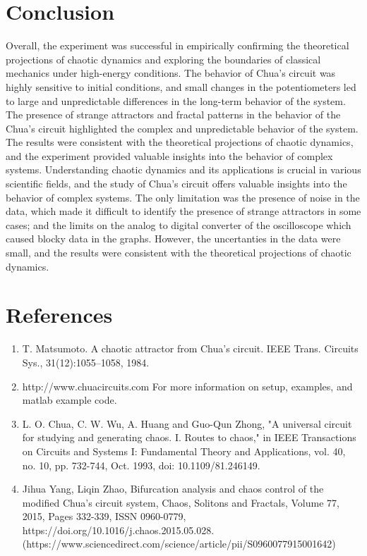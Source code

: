 \documentclass[12pt]{article}
\begin{document}
\section{Conclusion}
Overall, the experiment was successful in empirically confirming the theoretical projections of chaotic dynamics and exploring the boundaries of classical 
mechanics under high-energy conditions. The behavior of Chua's circuit was highly sensitive to initial conditions, and small changes in the potentiometers 
led to large and unpredictable differences in the long-term behavior of the system. The presence of strange attractors and fractal patterns in the behavior 
of the Chua's circuit highlighted the complex and unpredictable behavior of the system. The results were consistent with the theoretical projections 
of chaotic dynamics, and the experiment provided valuable insights into the behavior of complex systems. Understanding chaotic dynamics and its applications 
is crucial in various scientific fields, and the study of Chua's circuit offers valuable insights into the behavior of complex systems. The only limitation
was the presence of noise in the data, which made it difficult to identify the presence of strange attractors in some cases; and the limits on the analog to
digital converter of the oscilloscope which caused blocky data in the graphs. However, the uncertanties in the data were small, and the results were consistent
with the theoretical projections of chaotic dynamics.

\section{References}
    \begin{enumerate}
        \sloppy

        \item  T. Matsumoto. A chaotic attractor from Chua’s circuit. IEEE Trans. Circuits Sys., 31(12):1055–1058, 1984.
        \item  http://www.chuacircuits.com For more information on setup, examples, and matlab example code.
        \item L. O. Chua, C. W. Wu, A. Huang and Guo-Qun Zhong, "A universal circuit for studying and generating chaos. I. Routes to chaos," in IEEE Transactions on Circuits and Systems I: Fundamental Theory and Applications, vol. 40, no. 10, pp. 732-744, Oct. 1993, doi: 10.1109/81.246149.
        \item Jihua Yang, Liqin Zhao,
        Bifurcation analysis and chaos control of the modified Chua’s circuit system,
        Chaos, Solitons and Fractals,
        Volume 77,
        2015,
        Pages 332-339,
        ISSN 0960-0779,
        https://doi.org/10.1016/j.chaos.2015.05.028.
        (https://www.sciencedirect.com/science/article/pii/S0960077915001642)

        

    \end{enumerate}
\end{document}
